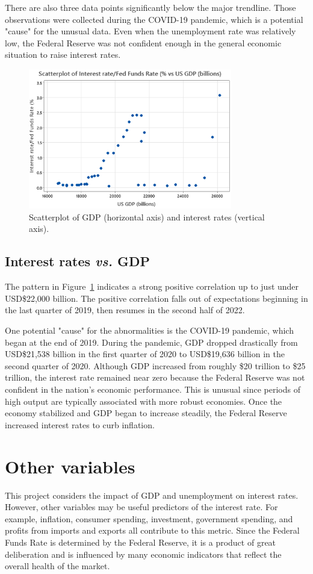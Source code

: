 \documentclass[12pt]{article}
\begin{document}
There are also three data points significantly below the major trendline. Those observations were collected during the COVID-19 pandemic, which is a potential "cause" for the unusual data. Even when the unemployment rate was relatively low, the Federal Reserve was not confident enough in the general economic situation to raise interest rates.
\begin{figure}
\begin{center}
\includegraphics[width=3.5in]{images/gdp-scatterplot.png}
\end{center}
\caption{Scatterplot of GDP (horizontal axis) and interest rates (vertical axis).
\label{fig:gdpscatterplot}}
\end{figure}
\subsection{Interest rates \textit{vs.} GDP}
The pattern in Figure~\ref{fig:gdpscatterplot} indicates a strong positive correlation up to just under USD\$22,000 billion. The positive correlation falls out of expectations beginning in the last quarter of 2019, then resumes in the second half of 2022.

One potential "cause" for the abnormalities is the COVID-19 pandemic, which began at the end of 2019. During the pandemic, GDP dropped drastically from USD\$21,538 billion in the first quarter of 2020 to USD\$19,636 billion in the second quarter of 2020. Although GDP increased from roughly \$20 trillion to \$25 trillion, the interest rate remained near zero because the Federal Reserve was not confident in the nation's economic performance. This is unusual since periods of high output are typically associated with more robust economies. Once the economy stabilized and GDP began to increase steadily, the Federal Reserve increased interest rates to curb inflation. 
\section{Other variables}
\label{sec:othervariables}
This project considers the impact of GDP and unemployment on interest rates. However, other variables may be useful predictors of the interest rate. For example, inflation, consumer spending, investment, government spending, and profits from imports and exports all contribute to this metric. Since the Federal Funds Rate is determined by the Federal Reserve, it is a product of great deliberation and is influenced by many economic indicators that reflect the overall health of the market.
\end{document}
